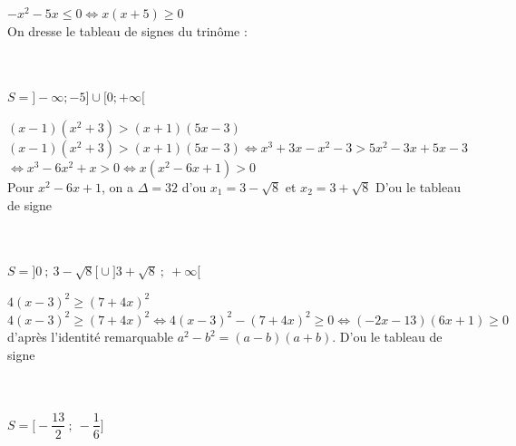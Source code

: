 \documentclass[12pt,a4paper]{book}
\begin{document}
\begin{enumMet}
        $-x^{2}-5 x \leq 0 \Leftrightarrow x(x+5) \geq 0$ \\
        On dresse le tableau de signes du trinôme : \\
        \\
        \ \\
        $S=\bigg] -\infty ; -5\bigg]\cup\bigg[ 0 ; +\infty\bigg[$
        \item $(x-1)\left(x^{2}+3\right)>(x+1)(5 x-3)$\\
        $(x-1)\left(x^{2}+3\right)>(x+1)(5 x-3) \Leftrightarrow x^3+3x-x^2-3 > 5x^2-3x+5x-3$\\
        $\Leftrightarrow x^3-6x^2+x > 0 \Leftrightarrow x(x^2-6x+1) > 0$\\
        Pour $x^2-6x+1$, on a $\Delta=32$ d'ou $x_1=3-\sqrt{8}$ et $x_2=3+\sqrt{8}$ 
        D'ou le tableau de signe\\
        \\
        \ \\
        $S=\bigg]0\ ;\ 3-\sqrt{8}\bigg[\cup\bigg]3+\sqrt{8}\ ;\ +\infty\bigg[$
        \item $4(x-3)^{2} \geqslant(7+4 x)^{2}$\\
        $4(x-3)^{2} \geqslant(7+4 x)^{2} \Leftrightarrow 4(x-3)^{2}-(7+4 x)^{2} \geqslant 0 \Leftrightarrow (-2 x-13)(6 x+1) \geqslant 0$ d'après l'identité remarquable $a^{2}-b^{2}=(a-b)(a+b)$. 
        D'ou le tableau de signe\\
        \\
        \ \\
        $S=\bigg[-\dfrac{13}{2}\ ;\ -\dfrac{1}{6}\bigg]$
    \end{enumMet}
\end{document}
